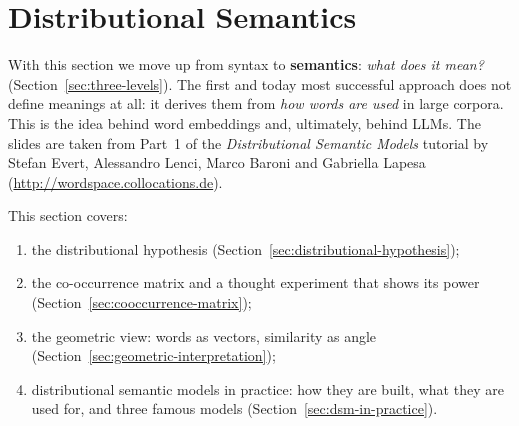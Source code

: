\section{Distributional Semantics}
\label{sec:distributional-semantics}

With this section we move up from syntax to \textbf{semantics}: \emph{what does it
mean?} (Section~\ref{sec:three-levels}). The first and today most successful approach
does not define meanings at all: it derives them from \emph{how words are used} in large
corpora. This is the idea behind word embeddings and, ultimately, behind LLMs. The
slides are taken from Part~1 of the \emph{Distributional Semantic Models} tutorial by
Stefan Evert, Alessandro Lenci, Marco Baroni and Gabriella Lapesa
(\url{http://wordspace.collocations.de}).

This section covers:
\begin{enumerate}[nosep]
  \item the distributional hypothesis (Section~\ref{sec:distributional-hypothesis});
  \item the co-occurrence matrix and a thought experiment that shows its power
        (Section~\ref{sec:cooccurrence-matrix});
  \item the geometric view: words as vectors, similarity as angle
        (Section~\ref{sec:geometric-interpretation});
  \item distributional semantic models in practice: how they are built, what they are
        used for, and three famous models (Section~\ref{sec:dsm-in-practice}).
\end{enumerate}





